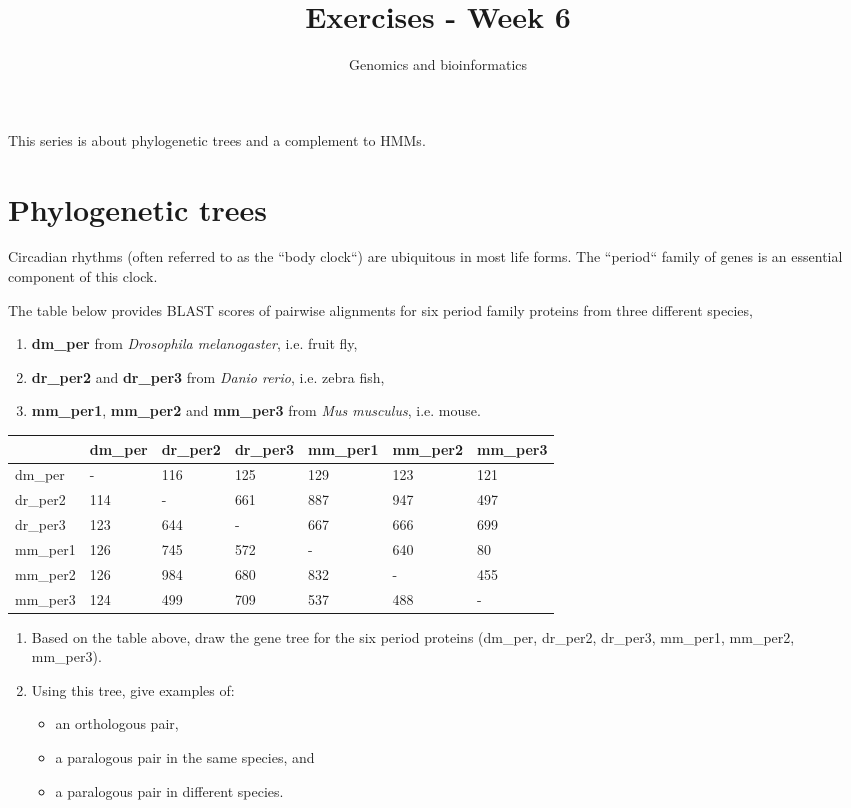 \documentclass[a4paper,11pt]{article}
\title{Exercises - Week 6}
\date{}
\author{Genomics and bioinformatics}
\begin{document}
\maketitle

This series is about phylogenetic trees and a complement to HMMs.

\section{Phylogenetic trees}

Circadian rhythms (often referred to as the ``body clock``) are
ubiquitous in most life forms. The ``period`` family of genes is an 
essential component of this clock.

The table below provides BLAST scores of pairwise
alignments for six period family proteins from three different
species, 

\begin{enumerate}
\item {\bf dm\_per} from {\it Drosophila melanogaster}, i.e. fruit fly,
\item {\bf dr\_per2} and {\bf dr\_per3} from {\it Danio rerio}, i.e. zebra fish,
\item {\bf mm\_per1}, {\bf mm\_per2} and {\bf mm\_per3} from {\it Mus
  musculus}, i.e. mouse.
\end{enumerate}

\begin{center}
	\begin{tabular} {| l || l | l | l | l | l | l |}
	\hline
 	& dm\_per & dr\_per2 & dr\_per3 & mm\_per1 & mm\_per2 & mm\_per3 \\ \hline\hline
	dm\_per & -  & 116 & 125 & 129 & 123 & 121 \\	\hline
	dr\_per2 &	114 & - & 661 & 887 & 947& 497 \\	\hline
	dr\_per3 & 123 & 644 & - & 667 & 666 & 699 \\	\hline
	mm\_per1 & 126 & 745 & 572 & - & 640 & 80 \\	\hline
	mm\_per2 & 126 & 984 & 680 & 832 & - & 455 \\	\hline
	mm\_per3 & 124 & 499 & 709 & 537 & 488 & - \\
	\hline
	\end{tabular}
\end{center}
\vspace{0.05 cm}

\begin{enumerate}
\item Based on the table above, draw the gene tree for the six period
  proteins (dm\_per, dr\_per2, dr\_per3,  mm\_per1, mm\_per2,
  mm\_per3). 
\item Using this tree, give examples of:
  \begin{itemize} 
  \item an orthologous pair, 
  \item a paralogous pair in the same species, and 
  \item a paralogous pair in different species.
  \end{itemize}
\end{enumerate}
\end{document}
